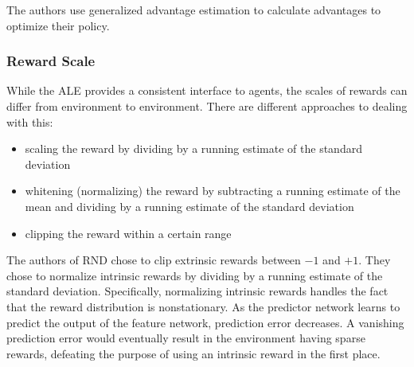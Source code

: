 \documentclass[journal, onecolumn, 12pt, draftclsnofoot]{IEEEtran}
\begin{document}
	\par The authors use generalized advantage estimation to calculate advantages to optimize their policy.

	\subsubsection{Reward Scale}
	\par While the ALE provides a consistent interface to agents, the scales of rewards can differ from environment to environment. There are different approaches to dealing with this:
	\begin{itemize}
		\item scaling the reward by dividing by a running estimate of the standard deviation
		\item whitening (normalizing) the reward by subtracting a running estimate of the mean and dividing by a running estimate of the standard deviation
		\item clipping the reward within a certain range
	\end{itemize}
	\par The authors of RND chose to clip extrinsic rewards between $-1$ and $+1$. They chose to normalize intrinsic rewards by dividing by a running estimate of the standard deviation. Specifically, normalizing intrinsic rewards handles the fact that the reward distribution is nonstationary. As the predictor network learns to predict the output of the feature network, prediction error decreases. A vanishing prediction error would eventually result in the environment having sparse rewards, defeating the purpose of using an intrinsic reward in the first place.
\end{document}
